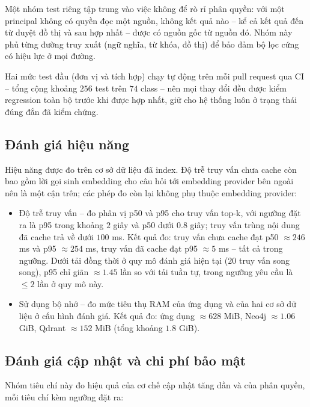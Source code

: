 Một nhóm test riêng tập trung vào việc không để rò rỉ phân quyền: với một principal không có quyền đọc một nguồn, không kết quả nào -- kể cả kết quả đến từ duyệt đồ thị và sau hợp nhất -- được có nguồn gốc từ nguồn đó. Nhóm này phủ từng đường truy xuất (ngữ nghĩa, từ khóa, đồ thị) để bảo đảm bộ lọc cứng có hiệu lực ở mọi đường.

Hai mức test đầu (đơn vị và tích hợp) chạy tự động trên mỗi pull request qua CI -- tổng cộng khoảng $256$ test trên $74$ class -- nên mọi thay đổi đều được kiểm regression toàn bộ trước khi được hợp nhất, giữ cho hệ thống luôn ở trạng thái đúng đắn đã kiểm chứng.

\subsection{Đánh giá hiệu năng}

Hiệu năng được đo trên cơ sở dữ liệu đã index. Độ trễ truy vấn chưa cache còn bao gồm lời gọi sinh embedding cho câu hỏi tới embedding provider bên ngoài nên là một cận trên; các phép đo còn lại không phụ thuộc embedding provider:

\begin{itemize}
  \item Độ trễ truy vấn -- đo phân vị p50 và p95 cho truy vấn top-k, với ngưỡng đặt ra là p95 trong khoảng $2$ giây và p50 dưới $0.8$ giây; truy vấn trùng nội dung đã cache trả về dưới $100$ ms. Kết quả đo: truy vấn chưa cache đạt p50 $\approx 246$ ms và p95 $\approx 254$ ms, truy vấn đã cache đạt p95 $\approx 5$ ms -- tất cả trong ngưỡng. Dưới tải đồng thời ở quy mô đánh giá hiện tại ($20$ truy vấn song song), p95 chỉ giãn $\approx 1.45$ lần so với tải tuần tự, trong ngưỡng yêu cầu là $\leq 2$ lần ở quy mô này.
  \item Sử dụng bộ nhớ -- đo mức tiêu thụ RAM của ứng dụng và của hai cơ sở dữ liệu ở cấu hình đánh giá. Kết quả đo: ứng dụng $\approx 628$ MiB, Neo4j $\approx 1.06$ GiB, Qdrant $\approx 152$ MiB (tổng khoảng $1.8$ GiB).
\end{itemize}

\subsection{Đánh giá cập nhật và chi phí bảo mật}

Nhóm tiêu chí này đo hiệu quả của cơ chế cập nhật tăng dần và của phân quyền, mỗi tiêu chí kèm ngưỡng đặt ra:


